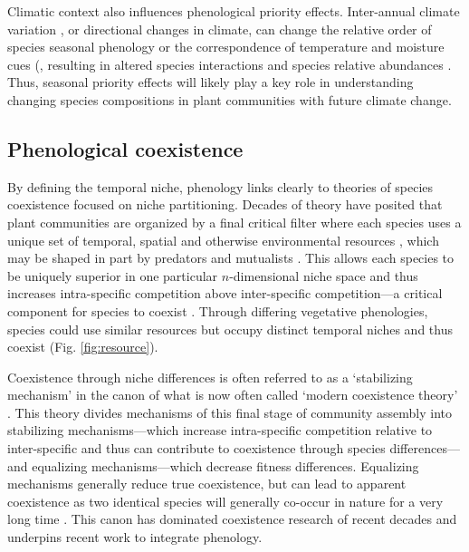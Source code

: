 \documentclass[11pt]{article}
\begin{document}
Climatic context also influences phenological priority effects. Inter-annual climate variation \citep{levine2011seasonal}, or directional changes in climate, can change the relative order of species seasonal phenology or the correspondence of temperature and moisture cues (\cite{kimball2010contemporary}, resulting in altered species interactions and species relative abundances \citep{thomson2017between,kimball2010contemporary,buonaiuto2023contrasting}. Thus, seasonal priority effects will likely play a key role in understanding changing species compositions in plant communities with future climate change.

\subsection*{Phenological coexistence}

By defining the temporal niche, phenology links clearly to theories of species coexistence focused on niche partitioning. Decades of theory have posited that plant communities are organized by a final critical filter where each species uses a unique set of temporal, spatial and otherwise environmental resources \citep{Hutchinson:1959xi}, which may be shaped in part by predators and mutualists \citep{mcpeek2022coexistence}. This allows each species to be uniquely superior in one particular $n$-dimensional niche space and thus increases intra-specific competition above inter-specific competition---a critical component for species to coexist \citep{Chesson:2000vd,hillerislambers2012rethinking,mcpeek2022coexistence}. Through differing vegetative phenologies, species could use similar resources but occupy distinct temporal niches and thus coexist (Fig. \ref{fig:resource}). 

Coexistence through niche differences is often referred to as a `stabilizing mechanism' in the canon of what is now often called `modern coexistence theory' \citep{Chesson:2000vd}. This theory divides mechanisms of this final stage of community assembly into stabilizing mechanisms---which increase intra-specific competition relative to inter-specific and thus can contribute to coexistence through species differences---and equalizing mechanisms---which decrease fitness differences. Equalizing mechanisms generally reduce true coexistence, but can lead to apparent coexistence as two identical species will generally co-occur in nature for a very long time  \citep[until one is lost to stochasticity,][]{Hubbell:2001vo}. This canon has dominated coexistence research of recent decades and underpins recent work to integrate phenology.
\end{document}
